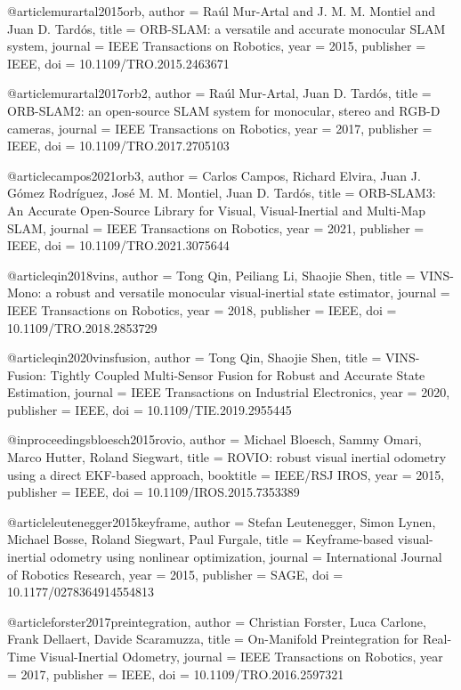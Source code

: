 @article{murartal2015orb,
  author = {Raúl Mur-Artal and J. M. M. Montiel and Juan D. Tardós},
  title = {ORB-SLAM: a versatile and accurate monocular SLAM system},
  journal = {IEEE Transactions on Robotics},
  year = {2015},
  publisher = {IEEE},
  doi = {10.1109/TRO.2015.2463671}
}

@article{murartal2017orb2,
  author = {Raúl Mur-Artal, Juan D. Tardós},
  title = {ORB-SLAM2: an open-source SLAM system for monocular, stereo and RGB-D cameras},
  journal = {IEEE Transactions on Robotics},
  year = {2017},
  publisher = {IEEE},
  doi = {10.1109/TRO.2017.2705103}
}

@article{campos2021orb3,
  author = {Carlos Campos, Richard Elvira, Juan J. Gómez Rodríguez, José M. M. Montiel, Juan D. Tardós},
  title = {ORB-SLAM3: An Accurate Open-Source Library for Visual, Visual-Inertial and Multi-Map SLAM},
  journal = {IEEE Transactions on Robotics},
  year = {2021},
  publisher = {IEEE},
  doi = {10.1109/TRO.2021.3075644}
}

@article{qin2018vins,
  author = {Tong Qin, Peiliang Li, Shaojie Shen},
  title = {VINS-Mono: a robust and versatile monocular visual-inertial state estimator},
  journal = {IEEE Transactions on Robotics},
  year = {2018},
  publisher = {IEEE},
  doi = {10.1109/TRO.2018.2853729}
}

@article{qin2020vinsfusion,
  author = {Tong Qin, Shaojie Shen},
  title = {VINS-Fusion: Tightly Coupled Multi-Sensor Fusion for Robust and Accurate State Estimation},
  journal = {IEEE Transactions on Industrial Electronics},
  year = {2020},
  publisher = {IEEE},
  doi = {10.1109/TIE.2019.2955445}
}

@inproceedings{bloesch2015rovio,
  author = {Michael Bloesch, Sammy Omari, Marco Hutter, Roland Siegwart},
  title = {ROVIO: robust visual inertial odometry using a direct EKF-based approach},
  booktitle = {IEEE/RSJ IROS},
  year = {2015},
  publisher = {IEEE},
  doi = {10.1109/IROS.2015.7353389}
}

@article{leutenegger2015keyframe,
  author = {Stefan Leutenegger, Simon Lynen, Michael Bosse, Roland Siegwart, Paul Furgale},
  title = {Keyframe-based visual-inertial odometry using nonlinear optimization},
  journal = {International Journal of Robotics Research},
  year = {2015},
  publisher = {SAGE},
  doi = {10.1177/0278364914554813}
}

@article{forster2017preintegration,
  author = {Christian Forster, Luca Carlone, Frank Dellaert, Davide Scaramuzza},
  title = {On-Manifold Preintegration for Real-Time Visual-Inertial Odometry},
  journal = {IEEE Transactions on Robotics},
  year = {2017},
  publisher = {IEEE},
  doi = {10.1109/TRO.2016.2597321}
}

